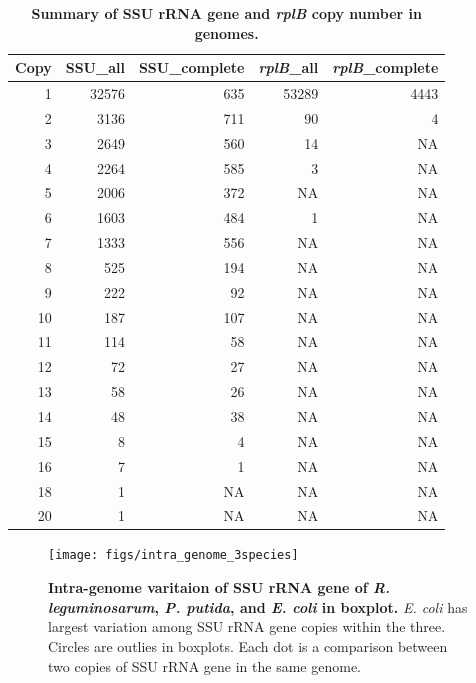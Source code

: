 \documentclass[]{msu-thesis}
\begin{document}
\begin{table}[htbp]
  \centering
  \caption[Summary of SSU rRNA gene and \textit{rplB} copy number in genomes]{\textbf{Summary of SSU rRNA gene and \textit{rplB} copy number in genomes.} }
    \begin{tabular}{|rrrrr|}
    \toprule
    \multicolumn{1}{|l}{Copy} & \multicolumn{1}{l}{SSU\_all} & \multicolumn{1}{l}{SSU\_complete} & \multicolumn{1}{l}{\textit{rplB}\_all} & \multicolumn{1}{l|}{\textit{rplB}\_complete} \\
    \midrule
    1     & 32576 & 635   & 53289 & 4443 \\
    2     & 3136  & 711   & 90    & 4 \\
    3     & 2649  & 560   & 14    & NA \\
    4     & 2264  & 585   & 3     & NA \\
    5     & 2006  & 372   & NA    & NA \\
    6     & 1603  & 484   & 1     & NA \\
    7     & 1333  & 556   & NA    & NA \\
    8     & 525   & 194   & NA    & NA \\
    9     & 222   & 92    & NA    & NA \\
    10    & 187   & 107   & NA    & NA \\
    11    & 114   & 58    & NA    & NA \\
    12    & 72    & 27    & NA    & NA \\
    13    & 58    & 26    & NA    & NA \\
    14    & 48    & 38    & NA    & NA \\
    15    & 8     & 4     & NA    & NA \\
    16    & 7     & 1     & NA    & NA \\
    18    & 1     & NA    & NA    & NA \\
    20    & 1     & NA    & NA    & NA \\
    \bottomrule
    \end{tabular}%
  \label{tab:S2}%
\end{table}%


\begin{figure}[tbph!]
  \centering
  \texttt{[image: figs/intra\_genome\_3species]}
  \caption[Intra-genome varitaion of SSU rRNA gene of \textit{R. leguminosarum}, \textit{P. putida}, and \textit{E. coli} in boxplot]{\textbf{Intra-genome varitaion of SSU rRNA gene of \textit{R. leguminosarum}, \textit{P. putida}, and \textit{E. coli} in boxplot.} \textit{E. coli} has largest variation among SSU rRNA gene copies within the three. Circles are outlies in boxplots. Each dot is a comparison between two copies of SSU rRNA gene in the same genome.}
  \label{fig:intraGenome3species}
\end{figure}
\end{document}

